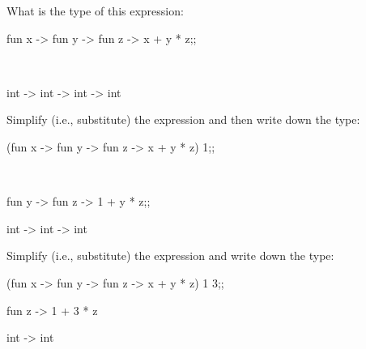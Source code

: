 

\renewcommand\AUTHOR{nweadick1@cougars.ccis.edu} %


\topmattertwo

\nextq
What is the type of this expression:
\begin{console}
fun x -> fun y -> fun z -> x + y * z;;
\end{console}
\\
\ANSWER
\begin{answercode}
int -> int -> int -> int
\end{answercode}

\nextq
Simplify (i.e., substitute) the expression and then write down the type:
\begin{console}
(fun x -> fun y -> fun z -> x + y * z) 1;;
\end{console}
\\
\ANSWER
\begin{answercode}
fun y -> fun z -> 1 + y * z;;
\end{answercode}
\begin{answercode}
int -> int -> int
\end{answercode}

\nextq
Simplify (i.e., substitute) the expression and write down the type:
\begin{console}
(fun x -> fun y -> fun z -> x + y * z) 1 3;;
\end{console}
\ANSWER
\begin{answercode}
fun z -> 1 + 3 * z
\end{answercode}
\begin{answercode}
int -> int 
\end{answercode}


\newpage


